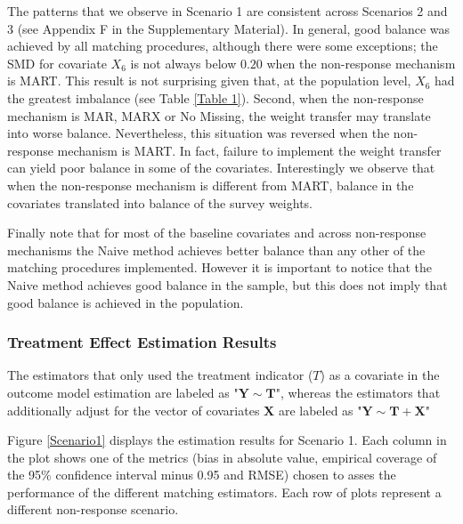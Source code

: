 \documentclass[oupdraft]{bio}
\begin{document}
The patterns that we observe in Scenario 1 are consistent across Scenarios 2 and 3 (see Appendix F in the Supplementary Material). In general, good balance was achieved by all matching procedures, although there were some exceptions; the SMD for covariate $X_{6}$ is not always below $0.20$ when the non-response mechanism is MART. This result is not surprising given that, at the population level, $X_{6}$ had the greatest imbalance (see Table \ref{Table 1}). Second, when the non-response mechanism is MAR, MARX or No Missing, the weight transfer may translate into worse balance. Nevertheless, this situation was reversed when the non-response mechanism is MART. In fact, failure to implement the weight transfer can yield poor balance in some of the covariates. Interestingly we observe that when the non-response mechanism is different from MART, balance in the covariates translated into balance of the survey weights. 

Finally note that for most of the baseline covariates and across non-response mechanisms the Naive method achieves better balance than any other of the matching procedures implemented.  However it is important to notice that the Naive method achieves good balance in the sample, but this does not imply that good balance is achieved in the population.  

\subsubsection*{Treatment Effect Estimation Results}
The estimators that only used the treatment indicator ($T$) as a covariate in the outcome model estimation are labeled as "$\mathbf{Y\sim T}$", whereas the estimators that additionally adjust for the vector of covariates $\mathbf{X}$ are labeled as "$\mathbf{Y\sim T+X}$"

Figure \ref{Scenario1} displays the estimation results for Scenario 1. Each column in the plot shows one of the metrics (bias in absolute value, empirical coverage of the 95\% confidence interval minus 0.95 and RMSE) chosen to asses the performance of the different matching estimators. Each row of plots represent a different non-response scenario. 
\end{document}
